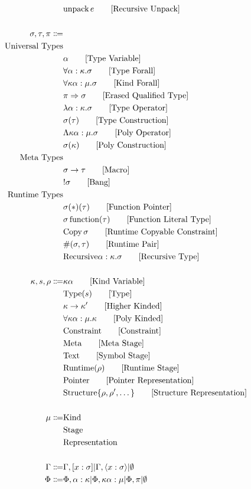 \documentclass {article}
\begin{document}
\begin{align*}
& \text{unpack} \, e \tag*{[Recursive Unpack]} \\
\\
\sigma, \tau, \pi \Coloneqq \\
\text{Universal Types} \\
& \alpha \tag* {[Type Variable]}\\
& \forall \alpha : \kappa. \sigma \tag*{[Type Forall]}\\ 
& \forall \kappa \alpha : \mu. \sigma \tag*{[Kind Forall]}\\
& \pi \Rightarrow \sigma \tag*{[Erased Qualified Type]} \\
& \lambda \alpha : \kappa. \sigma \tag*{[Type Operator]} \\
& \sigma (\tau) \tag*{[Type Construction]} \\
& \Lambda \kappa \alpha : \mu. \sigma \tag*{[Poly Operator]} \\
& \sigma (\kappa) \tag*{[Poly Construction]} \\
\text{Meta Types} \\
& \sigma \to \tau \tag*{[Macro]}\\
& !\sigma \tag*{[Bang]} \\
\text{Runtime Types} \\
& \sigma (*) (\tau) \tag*{[Function Pointer]}\\
& \sigma \, \text{function}(\tau) \tag*{[Function Literal Type]} \\
& \text{Copy} \, \sigma \tag*{[Runtime Copyable Constraint]} \\
& \#(\sigma, \tau) \tag*{[Runtime Pair]} \\
& \text{Recursive} \alpha : \kappa. \sigma \tag*{[Recursive Type]} \\
\\
\kappa, s, \rho \Coloneqq &  \kappa \alpha \tag*{[Kind Variable]} \\
& \text{Type} (s) \tag*{[Type]} \\
& \kappa \to \kappa' \tag*{[Higher Kinded]} \\
& \forall \kappa \alpha : \mu. \kappa \tag*{[Poly Kinded]}\\
& \text{Constraint} \tag*{[Constraint]} \\
& \text{Meta} \tag*{[Meta Stage]}\\
& \text{Text} \tag*{[Symbol Stage]} \\
& \text{Runtime} (\rho) \tag*{[Runtime Stage]}\\
& \text{Pointer} \tag*{[Pointer Representation]}\\
& \text{Structure} \{ \rho, \rho', \dots \} \tag*{[Structure Representation]} \\
\\
\mu \Coloneqq & \text{Kind} \\
& \text{Stage} \\
& \text{Representation} \\
\\
\Gamma \Coloneqq & \Gamma, [x : \sigma] | \Gamma, \langle x : \sigma \rangle | \emptyset \\
\Phi \Coloneqq & \Phi, \alpha : \kappa | \Phi, \kappa \alpha : \mu | \Phi, \pi|  \emptyset \\
\end{align*}
\end{document}
